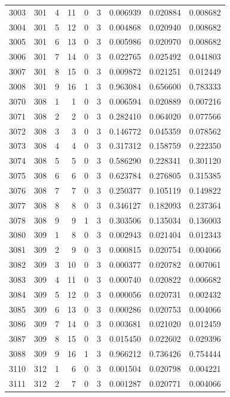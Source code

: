 \begin{longtable}{rrrrrrrrr}
3003 & 301 & 4 & 11 & 0 & 3 & 0.006939 & 0.020884 & 0.008682 \\
3004 & 301 & 5 & 12 & 0 & 3 & 0.004868 & 0.020940 & 0.008682 \\
3005 & 301 & 6 & 13 & 0 & 3 & 0.005986 & 0.020970 & 0.008682 \\
3006 & 301 & 7 & 14 & 0 & 3 & 0.022765 & 0.025492 & 0.041803 \\
3007 & 301 & 8 & 15 & 0 & 3 & 0.009872 & 0.021251 & 0.012449 \\
3008 & 301 & 9 & 16 & 1 & 3 & 0.963084 & 0.656600 & 0.783333 \\
3070 & 308 & 1 & 1 & 0 & 3 & 0.006594 & 0.020889 & 0.007216 \\
3071 & 308 & 2 & 2 & 0 & 3 & 0.282410 & 0.064020 & 0.077566 \\
3072 & 308 & 3 & 3 & 0 & 3 & 0.146772 & 0.045359 & 0.078562 \\
3073 & 308 & 4 & 4 & 0 & 3 & 0.317312 & 0.158759 & 0.222350 \\
3074 & 308 & 5 & 5 & 0 & 3 & 0.586290 & 0.228341 & 0.301120 \\
3075 & 308 & 6 & 6 & 0 & 3 & 0.623784 & 0.276805 & 0.315385 \\
3076 & 308 & 7 & 7 & 0 & 3 & 0.250377 & 0.105119 & 0.149822 \\
3077 & 308 & 8 & 8 & 0 & 3 & 0.346127 & 0.182093 & 0.237364 \\
3078 & 308 & 9 & 9 & 1 & 3 & 0.303506 & 0.135034 & 0.136003 \\
3080 & 309 & 1 & 8 & 0 & 3 & 0.002943 & 0.021404 & 0.012343 \\
3081 & 309 & 2 & 9 & 0 & 3 & 0.000815 & 0.020754 & 0.004066 \\
3082 & 309 & 3 & 10 & 0 & 3 & 0.000377 & 0.020782 & 0.007061 \\
3083 & 309 & 4 & 11 & 0 & 3 & 0.000740 & 0.020822 & 0.006682 \\
3084 & 309 & 5 & 12 & 0 & 3 & 0.000056 & 0.020731 & 0.002432 \\
3085 & 309 & 6 & 13 & 0 & 3 & 0.000286 & 0.020753 & 0.004066 \\
3086 & 309 & 7 & 14 & 0 & 3 & 0.003681 & 0.021020 & 0.012459 \\
3087 & 309 & 8 & 15 & 0 & 3 & 0.015450 & 0.022602 & 0.029396 \\
3088 & 309 & 9 & 16 & 1 & 3 & 0.966212 & 0.736426 & 0.754444 \\
3110 & 312 & 1 & 6 & 0 & 3 & 0.001504 & 0.020798 & 0.004221 \\
3111 & 312 & 2 & 7 & 0 & 3 & 0.001287 & 0.020771 & 0.004066 \\

\end{longtable}
